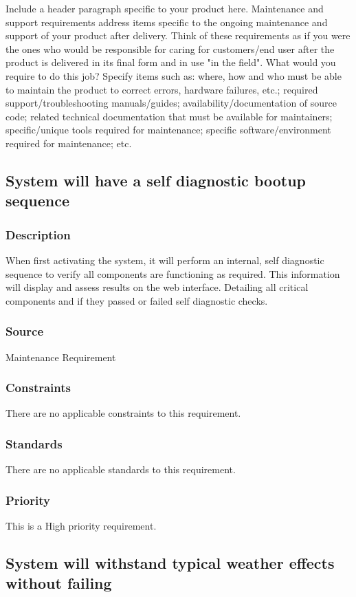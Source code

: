 Include a header paragraph specific to your product here. Maintenance and support requirements address items specific to the ongoing maintenance and support of your product after delivery. Think of these requirements as if you were the ones who would be responsible for caring for customers/end user after the product is delivered in its final form and in use "in the field". What would you require to do this job? Specify items such as: where, how and who must be able to maintain the product to correct errors, hardware failures, etc.; required support/troubleshooting manuals/guides; availability/documentation of source code; related technical documentation that must be available for maintainers; specific/unique tools required for maintenance; specific software/environment required for maintenance; etc.

\subsection{System will have a self diagnostic bootup sequence}
\subsubsection{Description}
When first activating the system, it will perform an internal, self diagnostic sequence to verify all components are functioning as required. This information will display and assess results on the web interface. Detailing all critical components and if they passed or failed self diagnostic checks.
\subsubsection{Source}
Maintenance Requirement
\subsubsection{Constraints}
There are no applicable constraints to this requirement.
\subsubsection{Standards}
There are no applicable standards to this requirement.
\subsubsection{Priority}
This is a High priority requirement.

\subsection{System will withstand typical weather effects without failing}
